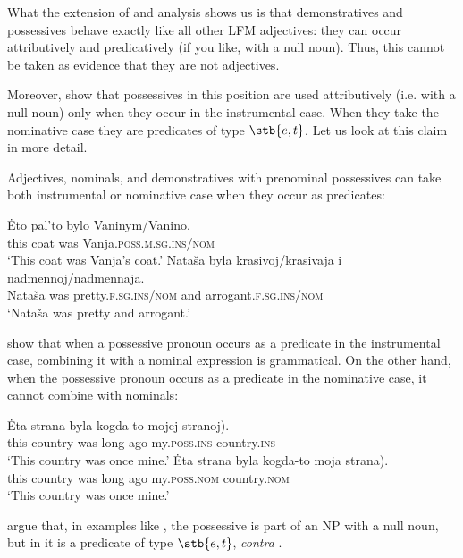 \documentclass[output=paper,
colorlinks,
citecolor=brown,
newtxmath
]{langscibook}
\begin{document}
What the extension of  and  analysis shows us is that demonstratives and possessives behave exactly like all other LFM adjectives: they can occur attributively and predicatively (if you like, with a null noun). Thus, this cannot be taken as evidence that they are not adjectives. 

Moreover, \citet{Partee.Borschev2003} show that possessives in this position are used attributively (i.e. with a null noun) only when they occur in the instrumental case. When they take the nominative case they are predicates of type $\stb{e,t}$. Let us look at this claim in more detail. 

Adjectives, nominals, and demonstratives with prenominal possessives can take both instrumental or nominative case when they occur as predicates:


\ea
    \ea \gll Ėto pal'to bylo Vaninym/Vanino.\\
    this coat was Vanja.\textsc{poss.m.sg.ins/nom}\\
    \glt `This coat was Vanja's coat.'
    \ex \gll Nataša byla krasivoj/krasivaja i nadmennoj/nadmennaja.\\
    Nataša was pretty.\textsc{f.sg.ins/nom} and arrogant.\textsc{f.sg.ins/nom}\\
    \glt `Nataša was pretty and arrogant.'
\z\z

\noindent \citeauthor{Partee.Borschev2003} show that when a possessive pronoun occurs as a predicate in the instrumental case, combining it with a nominal expression is grammatical. On the other hand, when the possessive pronoun occurs as a predicate in the nominative case, it cannot combine with nominals: 


\ea
    \ea \gll Ėta strana byla kogda-to mojej \minsp{(} stranoj).\label{stranoj}\\
    this country was {long ago} my.\textsc{poss.ins} {} country.\textsc{ins}\\
    \glt `This country was once mine.'
    \ex \gll Ėta strana byla kogda-to moja \minsp{(*} strana).\label{mojastrana}\\
    this country was {long ago} my.\textsc{poss.nom} {} country.\textsc{nom}\\
    \glt `This country was once mine.'
\z\z


\noindent \citeauthor{Partee.Borschev2003} argue that, in examples like , the possessive is part of an NP with a null noun, but in  it is a predicate of type $\stb{e,t}$, \textit{contra} \citet{Pereltsvaig2007}.
\end{document}
